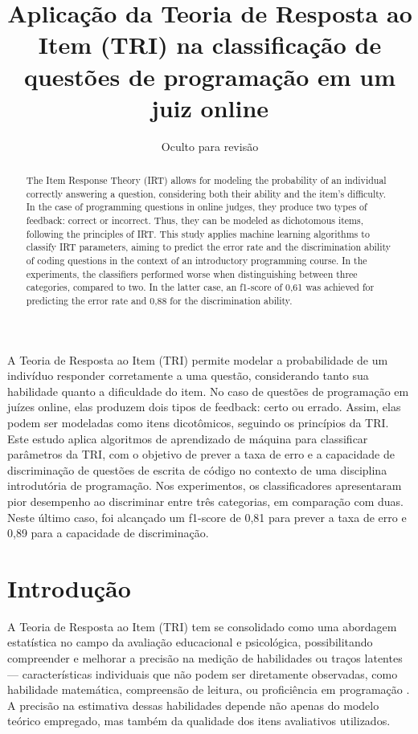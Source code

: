\documentclass[12pt]{article}
\title{Aplicação da Teoria de Resposta ao Item (TRI) na classificação de questões de programação em um juiz online}
\author{Oculto para revisão}
\begin{document}
\maketitle

\begin{resumo}
A Teoria de Resposta ao Item (TRI) permite modelar a probabilidade de um indivíduo responder corretamente a uma questão, considerando tanto sua habilidade quanto a dificuldade do item. No caso de questões de programação em juízes online, elas produzem dois tipos de feedback: certo ou errado. Assim, elas podem ser modeladas como itens dicotômicos, seguindo os princípios da TRI. Este estudo aplica algoritmos de aprendizado de máquina para classificar parâmetros da TRI, com o objetivo de prever a taxa de erro e a capacidade de discriminação de questões de escrita de código no contexto de uma disciplina introdutória de programação. Nos experimentos, os classificadores apresentaram pior desempenho ao discriminar entre três categorias, em comparação com duas. Neste último caso, foi alcançado um f1-score de 0,81 para prever a taxa de erro e 0,89 para a capacidade de discriminação.
\end{resumo}

\begin{abstract}
The Item Response Theory (IRT) allows for modeling the probability of an individual correctly answering a question, considering both their ability and the item's difficulty. In the case of programming questions in online judges, they produce two types of feedback: correct or incorrect. Thus, they can be modeled as dichotomous items, following the principles of IRT. This study applies machine learning algorithms to classify IRT parameters, aiming to predict the error rate and the discrimination ability of coding questions in the context of an introductory programming course. In the experiments, the classifiers performed worse when distinguishing between three categories, compared to two. In the latter case, an f1-score of 0,61 was achieved for predicting the error rate and 0,88 for the discrimination ability.
\end{abstract}


\section{Introdução}

A Teoria de Resposta ao Item (TRI) tem se consolidado como uma abordagem estatística no campo da avaliação educacional e psicológica, possibilitando compreender e melhorar a precisão na medição de habilidades ou traços latentes --- características individuais que não podem ser diretamente observadas, como habilidade matemática, compreensão de leitura, ou proficiência em programação \cite{Liz2020,pasquali2003}. A precisão na estimativa dessas habilidades depende não apenas do modelo teórico empregado, mas também da qualidade dos itens avaliativos utilizados.
\end{document}
